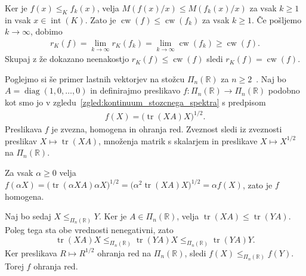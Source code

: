 \documentclass[mat2, tisk]{fmfdelo}
\newcommand{\R}{\mathbb{R}}
\begin{document}
\begin{dokaz}
  Ker je $f(x)\leq_K f_k(x)$, velja
  $M(f(x)/x)\leq M(f_k(x)/x)$ za vsak $k\geq1$ in vsak
  $x\in\operatorname{int}(K)$. Zato je
  $\operatorname{cw}(f)\leq\operatorname{cw}(f_k)$ za vsak $k\geq1$.
  Če pošljemo $k\to\infty$, dobimo
  \begin{align*}
  r_K(f)
  =
  \lim\limits_{k\to\infty}r_K(f_k)
  =
  \lim\limits_{k\to\infty}\operatorname{cw}(f_k)
  \geq
  \operatorname{cw}(f).
  \end{align*}
  Skupaj z že dokazano neenakostjo
  $r_K(f)\leq\operatorname{cw}(f)$ sledi
  $r_K(f)=\operatorname{cw}(f)$.
\end{dokaz}


\begin{zgled}\label{zgled:spekter_psd}
  Poglejmo si še primer lastnih vektorjev na stožcu
  $\Pi_n(\R)$ za $n\geq 2$~\cite[zgled 5.1]{LemmensNussbaum2013}.
  Naj bo
  $A=\operatorname{diag}(1,0,\ldots,0)$ in definirajmo preslikavo $f:\Pi_n(\R)\longrightarrow\Pi_n(\R)$ 
  podobno kot smo jo v zgledu~\ref{zgled:kontinuum_stozcnega_spektra} s predpisom
  \begin{align*}
  f(X)=\bigl(\operatorname{tr}(XA)X\bigr)^{1/2}.
  \end{align*}
  Preslikava $f$ je zvezna, homogena in ohranja red.
  Zveznost sledi iz zveznosti preslikav
  $X\mapsto\operatorname{tr}(XA)$, množenja matrik s skalarjem in
  preslikave $X\mapsto X^{1/2}$ na $\Pi_n(\R)$.

  Za vsak $\alpha\geq0$ velja
  $f(\alpha X)=
  \bigl(\operatorname{tr}(\alpha XA)\alpha X\bigr)^{1/2}
  =\bigl(\alpha^2\operatorname{tr}(XA)X\bigr)^{1/2}
  =
  \alpha f(X)$,
  zato je $f$ homogena.

  Naj bo sedaj $X\leq_{\Pi_n(\R)}Y$. Ker je $A\in\Pi_n(\R)$, velja
  $\operatorname{tr}(XA)\leq\operatorname{tr}(YA)$. Poleg tega sta obe
  vrednosti nenegativni, zato
  \[
  \operatorname{tr}(XA)X
  \leq_{\Pi_n(\R)}
  \operatorname{tr}(YA)X
  \leq_{\Pi_n(\R)}
  \operatorname{tr}(YA)Y.
  \]
  Ker preslikava $R\mapsto R^{1/2}$ ohranja red na $\Pi_n(\R)$, sledi
  $f(X)\leq_{\Pi_n(\R)}f(Y)$. Torej $f$ ohranja red.


\end{zgled}
\end{document}
